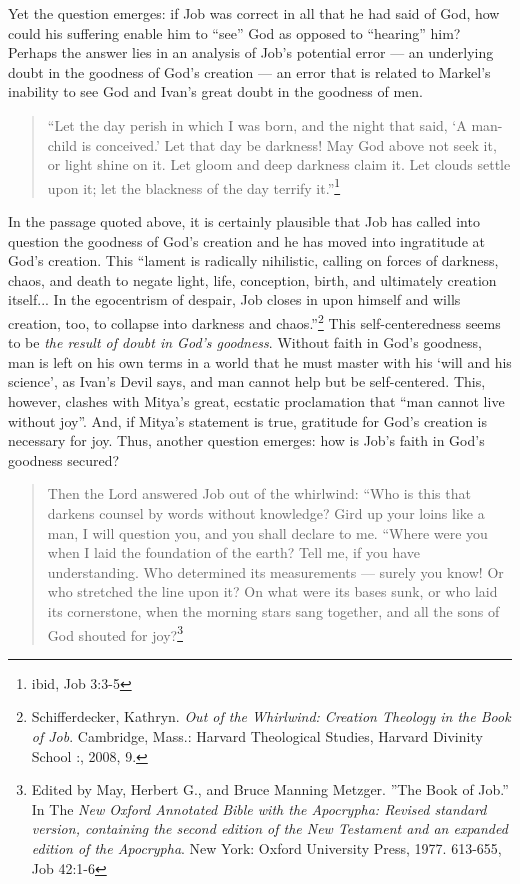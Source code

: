   Yet the question emerges: if Job was correct in all that he had said of God, how could his suffering enable him to ``see'' God as opposed to ``hearing'' him? Perhaps the answer lies in an analysis of Job's potential error --- an underlying doubt in the goodness of God's creation --- an error that is related to Markel's inability to see God and Ivan's great doubt in the goodness of men.
  
  \begin{quote}
  \onehalfspacing
  ``Let the day perish in which I was born, and the night that said, `A man-child is conceived.' Let that day be darkness! May God above not seek it, or light shine on it. Let gloom and deep darkness claim it. Let clouds settle upon it; let the blackness of the day terrify it.''\footnote{ibid, Job 3:3-5}
  \end{quote}
  
  In the passage quoted above, it is certainly plausible that Job has called into question the goodness of God's creation and he has moved into ingratitude at God's creation. This ``lament is radically nihilistic, calling on forces of darkness, chaos, and death to negate light, life, conception, birth, and ultimately creation itself... In the egocentrism of despair, Job closes in upon himself and wills creation, too, to collapse into darkness and chaos.''\footnote{Schifferdecker, Kathryn. \emph{Out of the Whirlwind: Creation Theology in the Book of Job}. Cambridge, Mass.: Harvard Theological Studies, Harvard Divinity School :, 2008, 9.} This self-centeredness seems to be \emph{the result of doubt in God's goodness}. Without faith in God's goodness, man is left on his own terms in a world that he must master with his `will and his science', as Ivan's Devil says, and man cannot help but be self-centered. This, however, clashes with Mitya's great, ecstatic proclamation that ``man cannot live without joy''. And, if Mitya's statement is true, gratitude for God's creation is necessary for joy. Thus, another question emerges: how is Job's faith in God's goodness secured?  
  

\begin{quote}
Then the Lord answered Job out of the whirlwind: ``Who is this that darkens counsel by words without knowledge? Gird up your loins like a man, I will question you, and you shall declare to me. ``Where were you when I laid the foundation of the earth? Tell me, if you have understanding. Who determined its measurements --- surely you know! Or who stretched the line upon it? On what were its bases sunk, or who laid its cornerstone, when the morning stars sang together, and all the sons of God shouted for joy?\footnote{Edited by May, Herbert G., and Bruce Manning Metzger. ''The Book of Job.'' In The \emph{New Oxford Annotated Bible with the Apocrypha: Revised standard version, containing the second edition of the New Testament and an expanded edition of the Apocrypha}. New York: Oxford University Press, 1977. 613-655, Job 42:1-6}
\end{quote}

